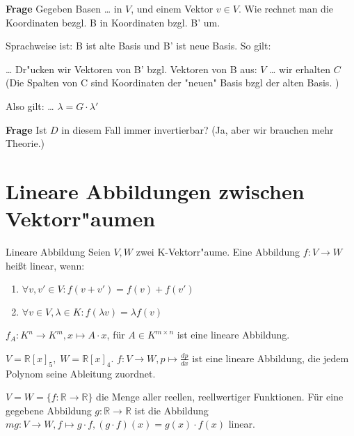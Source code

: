 \documentclass[fontsize=11pt,paper=a4,BCOR=0mm,DIV=11,automark,headsepline]{scrbook}
\theoremstyle{remark}
\theoremstyle{definition}
\theoremstyle{proof}
\theoremstyle{remark}
\begin{document}
\textbf{Frage} Gegeben Basen \ldots{} in \(V\), und einem Vektor \(v\in V\). Wie rechnet man die
Koordinaten bezgl. B in Koordinaten bzgl. B' um.

Sprachweise ist: B ist alte Basis und B' ist neue Basis.
So gilt:
\begin{relation}
\ldots{} Dr"ucken wir Vektoren von B' bzgl. Vektoren von B aus: \(V\) \ldots{}
wir erhalten \(C\) 
(Die Spalten von C sind Koordinaten der "neuen" Basis bzgl der alten Basis. )

Also gilt: \ldots{}
\(\lambda = G\cdot \lambda'\)
\end{relation}

\textbf{Frage} Ist \(D\) in diesem Fall immer invertierbar? (Ja, aber wir brauchen mehr Theorie.)

\chapter{Lineare Abbildungen zwischen Vektorr"aumen}
\label{sec:orgb4c03c4}
\begin{definition}{Lineare Abbildung}{}
Seien \(V, W\) zwei K-Vektorr"aume. Eine Abbildung \(f: V\rightarrow W\) heißt linear, wenn:

\begin{enumerate}
	\item \(\forall v,v' \in V: f(v+v')=f(v)+f(v')\)
	\item \(\forall v\in V, \lambda \in K: f(\lambda v)=\lambda f(v)\)
\end{enumerate}

\end{definition}

\begin{exa} \label{}
$f_{A}: K^n\rightarrow K^m, x\mapsto A\cdot x$, für $A \in K^{m\times n}$ ist eine lineare Abbildung.
\end{exa}

\begin{exa} \label{}
\(V=\mathbb{R}[x]_5,\;W=\mathbb{R}[x]_4\). $f: V\rightarrow W, p \mapsto \frac{dp}{dx}$ ist eine lineare Abbildung, die jedem Polynom seine Ableitung zuordnet.
\end{exa}

\begin{exa} \label{}
$V=W=\{f:\mathbb{R}\rightarrow\mathbb{R}\}$ die Menge aller reellen, reellwertiger Funktionen. Für eine gegebene Abbildung $g:\mathbb{R}\rightarrow\mathbb{R}$ ist die Abbildung $mg: V\rightarrow W, f\mapsto g\cdot f, (g\cdot f)(x)=g(x)\cdot f(x)$ linear.
\end{exa}
\end{document}

